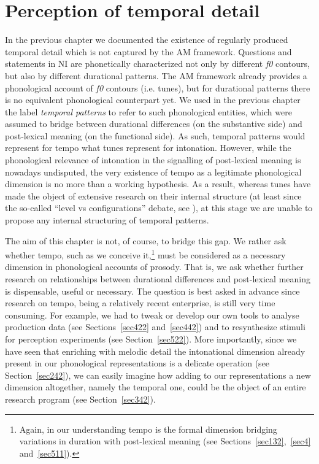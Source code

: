 \chapter[Perception of temporal detail]{Perception of temporal detail}\label{sec5}
In the previous chapter we documented the existence of regularly produced temporal detail which is not captured by the AM framework. Questions and statements in NI are phonetically characterized not only by different \textit{f0} contours, but also by different durational patterns. The AM framework already provides a phonological account of \textit{f0} contours (i.e. tunes), but for durational patterns there is no equivalent phonological counterpart yet. We used in the previous chapter the label \textit{temporal patterns} to refer to such phonological entities, which were assumed to bridge between durational differences (on the substantive side) and post-lexical meaning (on the functional side). As such, temporal patterns would represent for tempo what tunes represent for intonation. However, while the phonological relevance of intonation in the signalling of post-lexical meaning is nowadays undisputed, the very existence of tempo as a legitimate phonological dimension is no more than a working hypothesis. As a result, whereas tunes have made the object of extensive research on their internal structure (at least since the so-called ``level vs configurations'' debate, see \citealt[among others]{ladd2008intonational}), at this stage we are unable to propose any internal structuring of temporal patterns. 

The aim of this chapter is not, of course, to bridge this gap. We rather ask whether tempo, such as we conceive it,\footnote{Again, in our understanding tempo is the formal dimension bridging variations in duration with post-lexical meaning (see Sections~\ref{sec132},~\ref{sec4} and~\ref{sec511}).} must be considered as a necessary dimension in phonological accounts of prosody. That is, we ask whether further research on relationships between durational differences and post-lexical meaning is dispensable, useful or necessary. The question is best asked in advance since research on tempo, being a relatively recent enterprise, is still very time consuming. For example, we had to tweak or develop our own tools to analyse production data (see Sections~\ref{sec422} and~\ref{sec442}) and to resynthesize stimuli for perception experiments (see Section~\ref{sec522}). More importantly, since we have seen that enriching with melodic detail the intonational dimension already present in our phonological representations is a delicate operation (see Section~\ref{sec242}), we can easily imagine how adding to our representations a new dimension altogether, namely the temporal one, could be the object of an entire research program (see Section~\ref{sec342}).

